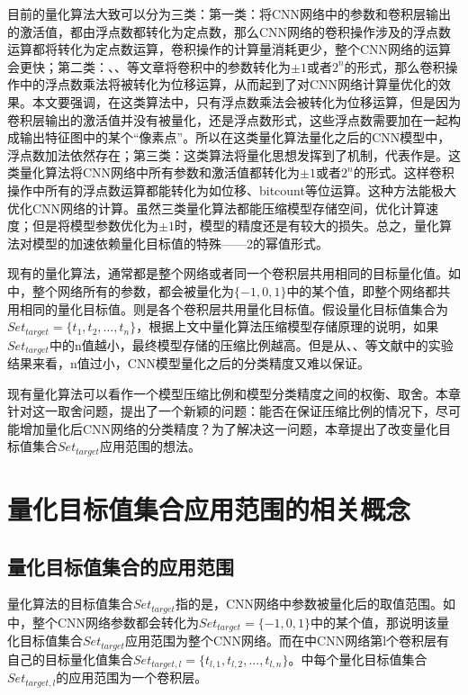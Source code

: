 \documentclass[ pdftex, oneside, master]{NJUthesis}
\begin{document}
目前的量化算法大致可以分为三类：第一类：\cite{quantization}将CNN网络中的参数和卷积层输出的激活值，都由浮点数都转化为定点数，那么CNN网络的卷积操作涉及的浮点数运算都将转化为定点数运算，卷积操作的计算量消耗更少，整个CNN网络的运算会更快；第二类：\cite{binary}、\cite{incremental}、\cite{extremely}等文章将卷积中的参数转化为$\pm 1$或者$2^n$的形式，那么卷积操作中的浮点数乘法将被转化为位移运算，从而起到了对CNN网络计算量优化的效果。本文要强调，在这类算法中，只有浮点数乘法会被转化为位移运算，但是因为卷积层输出的激活值并没有被量化，还是浮点数形式，这些浮点数需要加在一起构成输出特征图中的某个“像素点”。所以在这类量化算法量化之后的CNN模型中，浮点数加法依然存在；第三类：这类算法将量化思想发挥到了机制，代表作是\cite{xnornet}。这类量化算法将CNN网络中所有参数和激活值都转化为$\pm 1$或者$2^n$的形式。这样卷积操作中所有的浮点数运算都能转化为如位移、bitcount等位运算。这种方法能极大优化CNN网络的计算。虽然三类量化算法都能压缩模型存储空间，优化计算速度；但是将模型参数优化为$\pm 1$时，模型的精度还是有较大的损失。总之，量化算法对模型的加速依赖量化目标值的特殊——2的幂值形式。

现有的量化算法，通常都是整个网络或者同一个卷积层共用相同的目标量化值。如\cite{ternary}中，整个网络所有的参数，都会被量化为$\{-1, 0, 1\}$中的某个值，即整个网络都共用相同的量化目标值。\cite{incremental}则是各个卷积层共用量化目标值。假设量化目标值集合为$Set_{target} = \{t_1, t_2, \dots, t_n\}$，根据上文中量化算法压缩模型存储原理的说明，如果$Set_{target}$中的n值越小，最终模型存储的压缩比例越高。但是从\cite{binary}、\cite{ternary2}、\cite{xnornet}等文献中的实验结果来看，n值过小，CNN模型量化之后的分类精度又难以保证。

现有量化算法可以看作一个模型压缩比例和模型分类精度之间的权衡、取舍。本章针对这一取舍问题，提出了一个新颖的问题：能否在保证压缩比例的情况下，尽可能增加量化后CNN网络的分类精度？为了解决这一问题，本章提出了改变量化目标值集合$Set_{target}$应用范围的想法。

\section{量化目标值集合应用范围的相关概念 }

\subsection{量化目标值集合的应用范围}

量化算法的目标值集合$Set_{target}$指的是，CNN网络中参数被量化后的取值范围。如\cite{ternary}中，整个CNN网络参数都会转化为$Set_{target} = \{-1, 0, 1\}$中的某个值，那说明该量化目标值集合$Set_{target}$应用范围为整个CNN网络。而在\cite{incremental}中CNN网络第l个卷积层有自己的目标量化值集合$Set_{target,l} = \{t_{l,1}, t_{l,2}, \dots, t_{l,n}\}$。\cite{incremental}中每个量化目标值集合$Set_{target,l}$的应用范围为一个卷积层。
\end{document}
